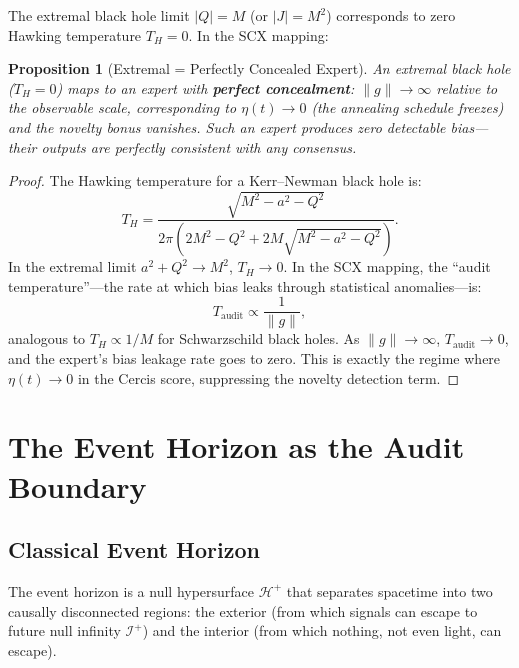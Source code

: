 \documentclass[12pt,a4paper]{article}
\newtheorem{proposition}[theorem]{Proposition}
\theoremstyle{remark}
\newcommand{\SCX}{\textsf{SCX}}
\newcommand{\Cercis}{\textsf{Cercis}}
\begin{document}
The extremal black hole limit $|Q| = M$ (or $|J| = M^2$) corresponds to zero Hawking temperature $T_H = 0$. In the \SCX{} mapping:

\begin{proposition}[Extremal = Perfectly Concealed Expert]
\label{prop:extremal}
An extremal black hole ($T_H = 0$) maps to an expert with \textbf{perfect concealment}: $\|g\| \to \infty$ relative to the observable scale, corresponding to $\eta(t) \to 0$ (the annealing schedule freezes) and the novelty bonus vanishes. Such an expert produces zero detectable bias---their outputs are perfectly consistent with any consensus.
\end{proposition}

\begin{proof}
The Hawking temperature for a Kerr--Newman black hole is:
\begin{equation}
  T_H = \frac{\sqrt{M^2 - a^2 - Q^2}}{2\pi(2M^2 - Q^2 + 2M\sqrt{M^2 - a^2 - Q^2})}.
\end{equation}
In the extremal limit $a^2 + Q^2 \to M^2$, $T_H \to 0$. In the \SCX{} mapping, the ``audit temperature''---the rate at which bias leaks through statistical anomalies---is:
\begin{equation}
  T_{\text{audit}} \propto \frac{1}{\|g\|},
\end{equation}
analogous to $T_H \propto 1/M$ for Schwarzschild black holes. As $\|g\| \to \infty$, $T_{\text{audit}} \to 0$, and the expert's bias leakage rate goes to zero. This is exactly the regime where $\eta(t) \to 0$ in the \Cercis{} score, suppressing the novelty detection term.
\end{proof}


\section{The Event Horizon as the Audit Boundary}
\label{sec:horizon}

\subsection{Classical Event Horizon}

The event horizon is a null hypersurface $\mathcal{H}^+$ that separates spacetime into two causally disconnected regions: the exterior (from which signals can escape to future null infinity $\mathcal{I}^+$) and the interior (from which nothing, not even light, can escape).
\end{document}
